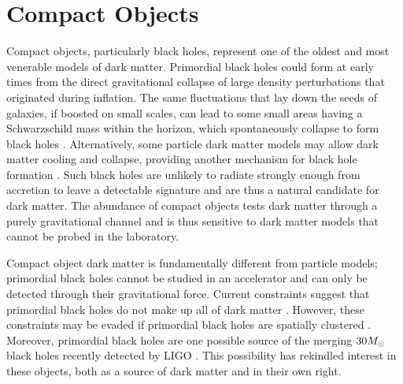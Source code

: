 \section{Compact Objects }
\label{sec:machos}

Compact objects, particularly black holes, represent one of the oldest and most venerable models of dark matter. 
Primordial black holes could form at early times from the direct gravitational collapse of large density perturbations that originated during inflation.
The same fluctuations that lay down the seeds of galaxies, if boosted on small scales, can lead to some small areas having a Schwarzschild mass within the horizon, which spontaneously collapse to form black holes \citep{Carr:1974nx,Meszaros:1974,1975Natur.253..251C,Bellido:1996,2016PhRvD..94h3504C}. 
Alternatively, some particle dark matter models may allow dark matter cooling and collapse, providing another mechanism for black hole formation \citep[\eg][]{1705.10341,1707.03419,1707.03829,1802.08206,1812.07000}.
Such black holes are unlikely to radiate strongly enough from accretion to leave a detectable signature and are thus a natural candidate for dark matter.
The abundance of compact objects tests dark matter through a purely gravitational channel and is thus sensitive to dark matter models that cannot be probed in the laboratory.

Compact object dark matter is fundamentally different from particle models; primordial black holes cannot be studied in an accelerator and can only be detected through their gravitational force. Current constraints suggest that primordial black holes do not make up all of dark matter \citep[\eg][]{Sasaki:2018}. However, these constraints may be evaded if primordial black holes are spatially clustered \citep{Clesse:2015,Clesse:2017}. Moreover, primordial black holes are one possible source of the merging $30 M_\odot$ black holes recently detected by LIGO \citep{Bird:2016,Clesse:2016}. This possibility has rekindled interest in these objects, both as a source of dark matter and in their own right.

